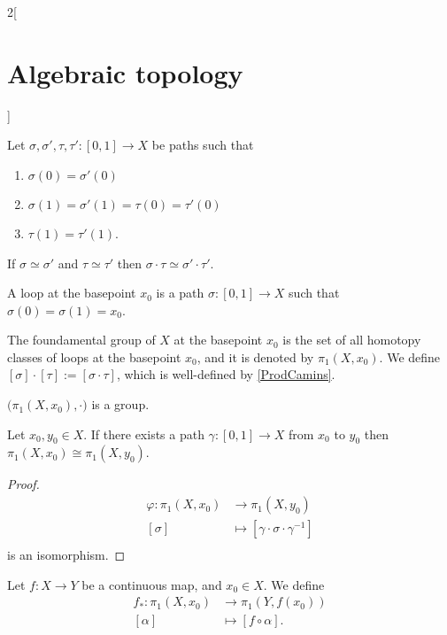 \documentclass[../../../main.tex]{subfiles}
\begin{document}
\begin{multicols}{2}[\section{Algebraic topology}]
\begin{definition}
	\end{definition}

	\begin{lemma}\label{ProdCamins}
		Let $\sigma, \sigma', \tau, \tau':[0,1]\to X$ be paths such that 
		\begin{enumerate}
			\item $\sigma(0)=\sigma'(0)$
			\item $\sigma(1)=\sigma'(1)=\tau(0)=\tau'(0)$
			\item $\tau(1)=\tau'(1)$.
		\end{enumerate}
		If $\sigma \simeq \sigma'$ and $\tau \simeq \tau'$ then $\sigma \cdot \tau \simeq \sigma' \cdot \tau'$.
	\end{lemma}

	\begin{definition}
		A loop at the basepoint $x_0$ is a path $\sigma: [0,1]\to X$ such that $\sigma(0)=\sigma(1)=x_0$.
	\end{definition}

	\begin{definition}
		The foundamental group of $X$ at the basepoint $x_0$ is the set of all homotopy classes of loops at the basepoint $x_0$, and it is denoted by $\pi_1 (X,x_0)$. We define $[\sigma]\cdot [\tau]:=[\sigma \cdot \tau]$, which is well-defined by \cref{ProdCamins}.
	\end{definition}

	\begin{proposition}
		$\big(\pi_1(X,x_0), \cdot \big)$ is a group.
	\end{proposition}
	
	\begin{proposition}
		Let $x_0, y_0 \in X$. If there exists a path $\gamma: [0,1] \to X$ from $x_0$ to $y_0$ then $\pi_1 (X,x_0) \cong \pi_1 (X,y_0)$.
	\end{proposition}
	
	\begin{proof}
		\begin{align*}
			\varphi: \pi_1(X,x_0) &\longrightarrow \pi_1(X,y_0) \\
			[\sigma]&\longmapsto [\gamma \cdot \sigma \cdot \gamma^{-1}]\\
		\end{align*}
		is an isomorphism.
	\end{proof}
	
	\begin{definition}
		Let $f:X\to Y$ be a continuous map, and $x_0 \in X$. We define 
		\begin{align*}
			f_*: \pi_1 (X,x_0) & \longrightarrow \pi_1 (Y,f(x_0)) \\
			[\alpha] &\longmapsto [f\circ \alpha].
		\end{align*}
		

\end{definition}
\end{multicols}
\end{document}
